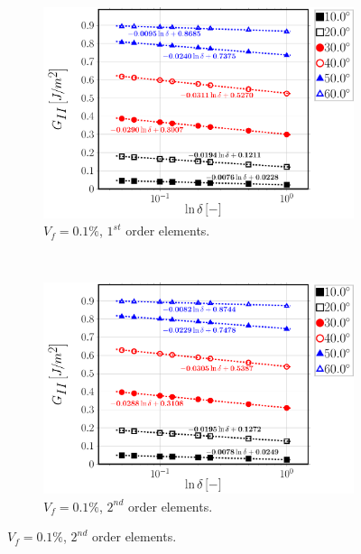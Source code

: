 \begin{figure}[!h]
\centering
    \begin{subfigure}[b]{0.48\textwidth}
        \includegraphics[width=\textwidth]{paperA/Vf0_1-free-1st-semilogvsDelta-GII.pdf}
       \caption{$V_{f}=0.1\%$, $1^{st}$ order elements.}
    \end{subfigure}
    ~
    \begin{subfigure}[b]{0.48\textwidth}
        \includegraphics[width=\textwidth]{paperA/Vf0_1-free-2nd-semilogvsDelta-GII.pdf}
       \caption{$V_{f}=0.1\%$, $2^{nd}$ order elements.}
    \end{subfigure}


\end{figure}
